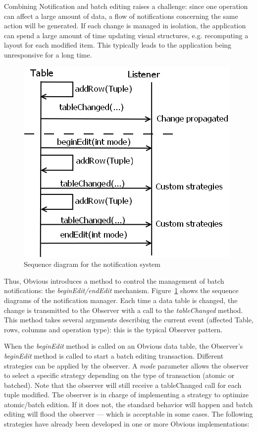 \label{sub:combiningnotif}

Combining Notification and batch editing raises a challenge: since one
operation can affect a large amount of data, a flow of notifications
concerning the same action will be generated.  If each change is
managed in isolation, the application can spend a large amount of time
updating visual structures, e.g. recomputing a layout for each
modified item.  This typically leads to the application being
unresponsive for a long time.

\begin{figure}[!ht]
  \centering
  \includegraphics[width=.5\columnwidth]{figures/notification}

  \caption{Sequence diagram for the notification system}
  \label{fig:notification}
\end{figure}

Thus, Obvious introduces a method to control the management of batch
notifications: the \emph{beginEdit/endEdit} mechanism.
Figure~\ref{fig:notification} shows the sequence diagrams of the
notification manager.  Each time a data table is changed, the change
is transmitted to the Observer with a call to the \emph{tableChanged}
method.  This method takes several arguments describing the current
event (affected Table, rows, columns and operation type): this is the
typical Observer pattern.

When the \emph{beginEdit} method is called on an Obvious data table,
the Observer's \emph{beginEdit} method is called to start a batch
editing transaction.  Different strategies can be applied by the
observer.  A \emph{mode} parameter allows the observer to select a
specific strategy depending on the type of transaction (atomic or
batched).  Note that the observer will still receive a tableChanged
call for each tuple modified.  The observer is in charge of
implementing a strategy to optimize atomic/batch edition.  If it does
not, the standard behavior will happen and batch editing will flood
the observer --- which is acceptable in some cases.  The following
strategies have already been developed in one or more Obvious
implementations:

